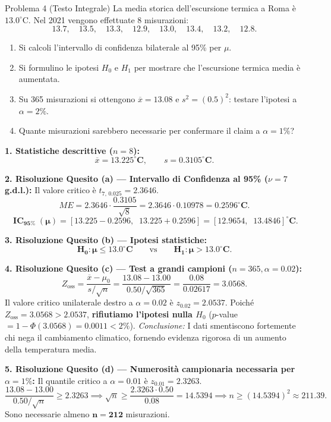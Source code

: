 \documentclass[11pt,a4paper]{article}
\begin{document}
\begin{problemabox}{Problema 4 (Testo Integrale)}
La media storica dell'escursione termica a Roma è $13.0^\circ\text{C}$. Nel 2021 vengono effettuate 8 misurazioni:
\[
13.7, \quad 13.5, \quad 13.3, \quad 12.9, \quad 13.0, \quad 13.4, \quad 13.2, \quad 12.8.
\]
\begin{enumerate}[label=(\alph*)]
    \item Si calcoli l'intervallo di confidenza bilaterale al 95\% per $\mu$.
    \item Si formulino le ipotesi $H_0$ e $H_1$ per mostrare che l'escursione termica media è aumentata.
    \item Su 365 misurazioni si ottengono $\overline{x} = 13.08$ e $s^2 = (0.5)^2$: testare l'ipotesi a $\alpha = 2\%$.
    \item Quante misurazioni sarebbero necessarie per confermare il claim a $\alpha = 1\%$?
\end{enumerate}
\end{problemabox}

\begin{soluzionebox}
\textbf{1. Statistiche descrittive ($n = 8$):}
\[
\overline{x} = \mathbf{13.225^\circ\text{C}}, \qquad s = \mathbf{0.3105^\circ\text{C}}.
\]

\textbf{2. Risoluzione Quesito (a) --- Intervallo di Confidenza al 95\% ($\nu = 7$ g.d.l.):}
Il valore critico è $t_{7, \, 0.025} = 2.3646$.
\[
ME = 2.3646 \cdot \frac{0.3105}{\sqrt{8}} = 2.3646 \cdot 0.10978 = \mathbf{0.2596^\circ\text{C}}.
\]
\[
\mathbf{\operatorname{IC}_{95\%}(\mu) = [13.225 - 0.2596, \;\; 13.225 + 0.2596] = [12.9654, \;\; 13.4846]^\circ\text{C}}.
\]

\textbf{3. Risoluzione Quesito (b) --- Ipotesi statistiche:}
\[
\mathbf{H_0: \mu \le 13.0^\circ\text{C}} \qquad \text{vs} \qquad \mathbf{H_1: \mu > 13.0^\circ\text{C}}.
\]

\textbf{4. Risoluzione Quesito (c) --- Test a grandi campioni ($n = 365, \alpha = 0.02$):}
\[
Z_{\text{oss}} = \frac{\overline{x} - \mu_0}{s/\sqrt{n}} = \frac{13.08 - 13.00}{0.50/\sqrt{365}} = \frac{0.08}{0.02617} = \mathbf{3.0568}.
\]
Il valore critico unilaterale destro a $\alpha = 0.02$ è $z_{0.02} = 2.0537$.
Poiché $Z_{\text{oss}} = 3.0568 > 2.0537$, \textbf{rifiutiamo l'ipotesi nulla $H_0$} ($p$-value $= 1 - \Phi(3.0568) = \mathbf{0.0011} < 2\%$).
\emph{Conclusione:} I dati smentiscono fortemente chi nega il cambiamento climatico, fornendo evidenza rigorosa di un aumento della temperatura media.

\textbf{5. Risoluzione Quesito (d) --- Numerosità campionaria necessaria per $\alpha = 1\%$:}
Il quantile critico a $\alpha = 0.01$ è $z_{0.01} = 2.3263$.
\[
\frac{13.08 - 13.00}{0.50 / \sqrt{n}} \ge 2.3263 \implies \sqrt{n} \ge \frac{2.3263 \cdot 0.50}{0.08} = 14.5394 \implies n \ge (14.5394)^2 \approx 211.39.
\]
Sono necessarie almeno $\mathbf{n = 212}$ misurazioni.
\end{soluzionebox}
\end{document}
